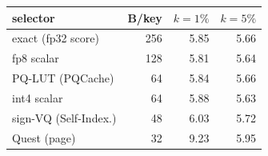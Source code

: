 \begin{tabular}{l r r r}
\toprule
selector & B/key & $k{=}1\%$ & $k{=}5\%$ \\
\midrule
exact (fp32 score) & 256 & 5.85 & 5.66 \\
fp8 scalar & 128 & 5.81 & 5.64 \\
PQ-LUT (PQCache) & 64 & 5.84 & 5.66 \\
int4 scalar & 64 & 5.88 & 5.63 \\
sign-VQ (Self-Index.) & 48 & 6.03 & 5.72 \\
Quest (page) & 32 & 9.23 & 5.95 \\
\bottomrule
\end{tabular}

